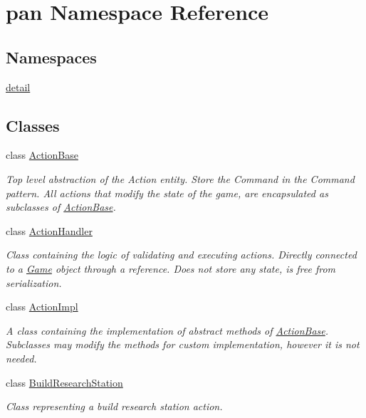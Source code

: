 \hypertarget{namespacepan}{}\section{pan Namespace Reference}
\label{namespacepan}
\subsection*{Namespaces}
\begin{DoxyCompactItemize}
\item 
 \hyperlink{namespacepan_1_1detail}{detail}
\end{DoxyCompactItemize}
\subsection*{Classes}
\begin{DoxyCompactItemize}
\item 
class \hyperlink{classpan_1_1_action_base}{Action\+Base}
\begin{DoxyCompactList}\small\item\em Top level abstraction of the Action entity. Store the Command in the Command pattern. All actions that modify the state of the game, are encapsulated as subclasses of \hyperlink{classpan_1_1_action_base}{Action\+Base}. \end{DoxyCompactList}\item 
class \hyperlink{classpan_1_1_action_handler}{Action\+Handler}
\begin{DoxyCompactList}\small\item\em Class containing the logic of validating and executing actions. Directly connected to a \hyperlink{classpan_1_1_game}{Game} object through a reference. Does not store any state, is free from serialization. \end{DoxyCompactList}\item 
class \hyperlink{classpan_1_1_action_impl}{Action\+Impl}
\begin{DoxyCompactList}\small\item\em A class containing the implementation of abstract methods of \hyperlink{classpan_1_1_action_base}{Action\+Base}. Subclasses may modify the methods for custom implementation, however it is not needed. \end{DoxyCompactList}\item 
class \hyperlink{classpan_1_1_build_research_station}{Build\+Research\+Station}
\begin{DoxyCompactList}\small\item\em Class representing a build research station action. \end{DoxyCompactList}\item 

\end{DoxyCompactItemize}
